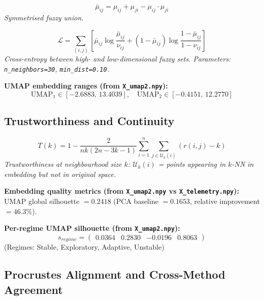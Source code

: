 \documentclass[12pt]{article}
\begin{document}
\begin{equation}
\bar{\mu}_{ij} = \mu_{ij} + \mu_{ji} - \mu_{ij}\cdot\mu_{ji}
\end{equation}
\noindent\textit{Symmetrised fuzzy union.}


\begin{equation}
\mathcal{L} = \sum_{(i,j)} \left[\bar{\mu}_{ij}\log\frac{\bar{\mu}_{ij}}{\nu_{ij}}+ (1-\bar{\mu}_{ij})\log\frac{1-\bar{\mu}_{ij}}{1-\nu_{ij}}\right]
\end{equation}
\noindent\textit{Cross-entropy between high- and low-dimensional fuzzy sets. Parameters: \texttt{n\_neighbors=30}, \texttt{min\_dist=0.10}.}


\noindent\textbf{UMAP embedding ranges (from \texttt{X\_umap2.npy}):}
\begin{equation}
\mathrm{UMAP}_1 \in [-2.6883,\,13.4039], \quad \mathrm{UMAP}_2 \in [-0.4151,\,12.2770]
\end{equation}



\subsection{Trustworthiness and Continuity}

\begin{equation}
T(k) = 1 - \frac{2}{nk(2n-3k-1)}\sum_{i=1}^{n}\sum_{j \in \mathcal{U}_k(i)}(r(i,j) - k)
\end{equation}
\noindent\textit{Trustworthiness at neighbourhood size $k$: $\mathcal{U}_k(i)$ = points appearing in $k$-NN in embedding but not in original space.}


\noindent\textbf{Embedding quality metrics (from \texttt{X\_umap2.npy} vs \texttt{X\_telemetry.npy}):}
UMAP global silhouette $= 0.2418$ (PCA baseline $= 0.1653$, relative improvement $= 46.3\%$).


\noindent\textbf{Per-regime UMAP silhouette (from \texttt{X\_umap2.npy}):}
\begin{equation}
s_{regime} = \begin{pmatrix}0.0364 & 0.2830 & -0.0196 & 0.8063\end{pmatrix}
\end{equation}
(Regimes: Stable, Exploratory, Adaptive, Unstable)



\subsection{Procrustes Alignment and Cross-Method Agreement}
\end{document}
